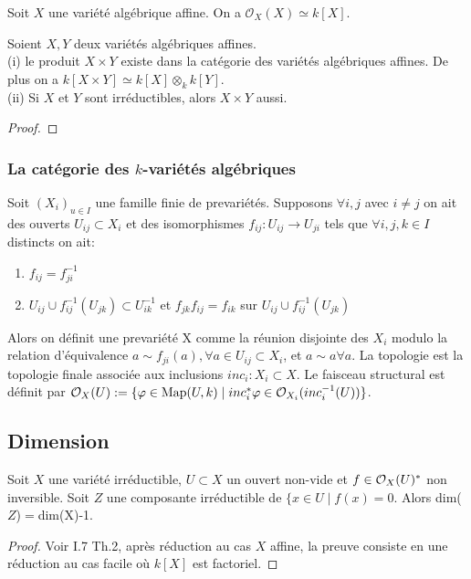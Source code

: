 \begin{cor}
Soit $X$ une variété algébrique affine. On a $\mathcal{O}_X(X)\simeq k[X]$.
\end{cor}



\begin{prop}Soient $X,Y$ deux variétés algébriques affines.\\
(i) le produit $X\times Y$ existe dans la catégorie des variétés algébriques affines. De plus on a $k[X\times Y]\simeq k[X]\otimes _k k[Y]$.\\
(ii) Si $X$ et $Y$ sont irréductibles, alors $X\times Y$ aussi.
\end{prop}
\begin{proof}

\end{proof}

\subsubsection{La catégorie des $k$-variétés algébriques}

\begin{cons}\label{gluevar}
Soit $(X_i)_{u\in I}$ une famille finie de prevariétés. Supposons $\forall i,j$ avec $i\neq j$ on ait des ouverts $U_{ij}\subset X_i$ et des isomorphismes $f_{ij}:U_{ij}\rightarrow U_{ji}$ tels que $\forall i,j,k\in I$ distincts on ait:
	\begin{enumerate}
	\item $f_{ij}=f_{ji}^{-1}$
	\item $U_{ij}\cup f_{ij}^{-1}(U_{jk})\subset U_{ik}^{-1}$ et $f_{jk}f_{ij}=f_{ik}$ sur $U_{ij}\cup f_{ij}^{-1}(U_{jk})$
	\end{enumerate}
Alors on définit une prevariété X comme la réunion disjointe des $X_i$ modulo la relation d'équivalence $a\sim f_{ji}(a),\forall a\in U_{ij}\subset X_i$, et $a\sim a \forall a$. La topologie est la topologie finale associée aux inclusions $inc_i:X_i\subset X$. Le faisceau structural est définit par $\mathcal{O}_X(U):=\lbrace \varphi\in \textrm{Map}(U,k)\mid inc_i^*\varphi\in\mathcal{O}_{X_i}(inc_i^{-1}(U))\rbrace$.
\end{cons}


\subsection{Dimension}

\begin{thm}\label{dimsousvariete}
Soit $X$ une variété irréductible, $U\subset X$ un ouvert non-vide et $f\in \mathcal{O}_X(U)^*$ non inversible. Soit $Z$ une composante irréductible de $\lbrace x \in U \mid f(x)=0$. Alors dim($Z$)$=$dim(X)-1.
\end{thm}
\begin{proof}
Voir \cite{MumfordRedBook} I.7 Th.2, après réduction au cas $X$ affine, la preuve consiste en une réduction au cas facile où $k[X]$ est factoriel. 
\end{proof}

